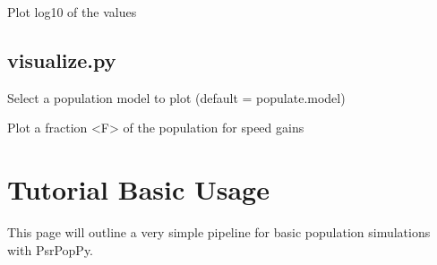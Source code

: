 \documentclass[letterpaper,10pt,english]{sphinxmanual}
\begin{document}
\begin{fulllineitems}
\label{\detokenize{cmd-line-docs:cmdoption-view.py-logx}}
\pysigstartsignatures
\pysigline
{\sphinxcode{\sphinxupquote{}}}
\pysigstopsignatures
\sphinxAtStartPar
Plot log10 of the values

\end{fulllineitems}



\section{visualize.py}
\label{\detokenize{cmd-line-docs:visualize-py}}\label{\detokenize{cmd-line-docs:visualize-docs}}

\begin{fulllineitems}
\label{\detokenize{cmd-line-docs:cmdoption-visualize.py-f}}
\pysigstartsignatures
\pysigline
{}
\pysigstopsignatures
\sphinxAtStartPar
Select a population model to plot (default = populate.model)

\end{fulllineitems}


\begin{fulllineitems}
\label{\detokenize{cmd-line-docs:cmdoption-visualize.py-frac}}
\pysigstartsignatures
\pysigline
{}
\pysigstopsignatures
\sphinxAtStartPar
Plot a fraction \textless{}F\textgreater{} of the population for speed gains

\end{fulllineitems}


\sphinxstepscope


\chapter{Tutorial \sphinxhyphen{} Basic Usage}
\label{\detokenize{tutorial-basic:tutorial-basic-usage}}\label{\detokenize{tutorial-basic:tutorial-basic}}\label{\detokenize{tutorial-basic::doc}}
\sphinxAtStartPar
This page will outline a very simple pipeline for basic population
simulations with PsrPopPy.
\end{document}
